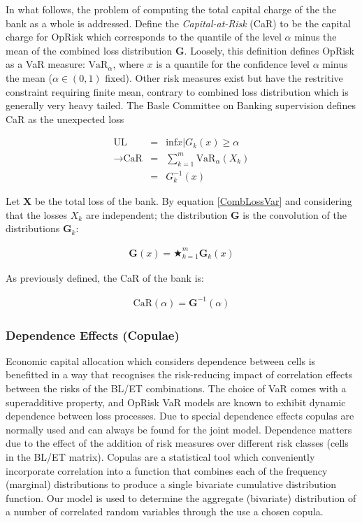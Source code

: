 \documentclass{DissertateUSU}
\begin{document}
In what follows, the problem of computing the total capital charge of
the the bank as a whole is addressed. Define the \emph{Capital-at-Risk}
(CaR) to be the capital charge for OpRisk which corresponds to the
quantile of the level \(\alpha\) minus the mean of the combined loss
distribution \(\mathbf{G}\). Loosely, this definition defines OpRisk as
a VaR measure: \(\mbox{VaR}_\alpha\), where \(x\) is a quantile for the
confidence level \(\alpha\) minus the mean (\(\alpha \in (0,1)\) fixed).
Other risk measures exist but have the restritive constraint requiring
finite mean, contrary to combined loss distribution which is generally
very heavy tailed. The Basle Committee on Banking supervision defines
CaR as the unexpected loss

\singlespacing

\begin{eqnarray}
\mbox{UL} &=& \mbox{inf}{x| G_k(x) \geq \alpha}\nonumber\\
\longrightarrow \mbox{CaR} &=& \sum_{k=1}^m \mbox{VaR}_\alpha(X_k)\nonumber\\
&=& G_k^{-1}(x)
\end{eqnarray} \doublespacing

Let \(\mathbf{X}\) be the total loss of the bank. By equation
\ref{CombLossVar} and considering that the losses \(X_k\) are
independent; the distribution \(\mathbf{G}\) is the convolution of the
distributions \(\mathbf{G}_k\):

\singlespacing

\begin{eqnarray}
\mathbf{G}(x) = \bigstar_{k=1}^m \mathbf{G}_k(x)
\end{eqnarray} \doublespacing

As previously defined, the CaR of the bank is:

\singlespacing

\begin{eqnarray}
\mbox{CaR}(\alpha) = \mathbf{G}^{-1}(\alpha)
\end{eqnarray} \doublespacing

\subsubsection{Dependence Effects (Copulae)}

Economic capital allocation which considers dependence between cells is
benefitted in a way that recognises the risk-reducing impact of
correlation effects between the risks of the BL/ET combinations. The
choice of VaR comes with a superadditive property, and OpRisk VaR models
are known to exhibit dynamic dependence between loss processes. Due to
special dependence effects copulas are normally used and can always be
found for the joint model. Dependence matters due to the effect of the
addition of risk measures over different risk classes (cells in the
BL/ET matrix). Copulas are a statistical tool which conveniently
incorporate correlation into a function that combines each of the
frequency (marginal) distributions to produce a single bivariate
cumulative distribution function. Our model is used to determine the
aggregate (bivariate) distribution of a number of correlated random
variables through the use a chosen copula. \medskip
\end{document}
